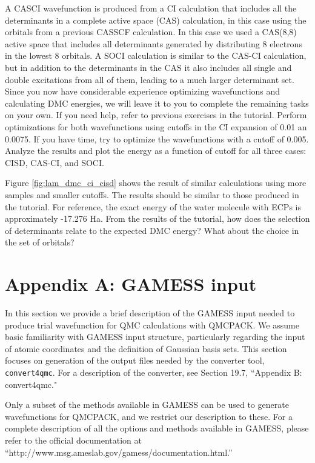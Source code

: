A CASCI wavefunction is produced from a CI calculation that includes all the determinants 
in a complete active space (CAS) calculation, in this case using the orbitals from a previous CASSCF
calculation. In this case we used a CAS(8,8) active space that includes all determinants
generated by distributing 8 electrons in the lowest 8 orbitals. A SOCI calculation is similar
to the CAS-CI calculation, but in addition to the determinants in the CAS it also includes
all single and double excitations from all of them, leading to a much larger determinant
set. Since you now have considerable experience optimizing wavefunctions and calculating
DMC energies, we will leave it to you to complete the remaining tasks on your own.
If you need help, refer to previous exercises in the tutorial. Perform optimizations for both
wavefunctions using cutoffs in the CI expansion of 0.01 an 0.0075. If you have time, try to optimize the wavefunctions with a cutoff of 0.005. Analyze the results and plot
the energy as a function of cutoff for all three cases: CISD, CAS-CI, and SOCI.

Figure  \ref{fig:lam_dmc_ci_cisd} shows the result of similar calculations using more samples and smaller cutoffs.
The results should be similar to those produced in the tutorial. For reference, the exact
energy of the water molecule with ECPs is approximately -17.276 Ha. From the results of the
tutorial, how does the selection of determinants relate to the expected DMC energy?
What about the choice in the set of orbitals?


\newpage
\section{Appendix A: GAMESS input}
In this section we provide a brief description of the GAMESS input needed to produce
trial wavefunction for QMC calculations with QMCPACK. We assume basic familiarity
with GAMESS input structure, particularly regarding the input of atomic coordinates and
the definition of Gaussian basis sets. This section focuses on generation of the output
files needed by the converter tool, \texttt{convert4qmc}. For a description of the converter, see Section 19.7, ``Appendix B: convert4qmc."

Only a subset of the methods available in GAMESS can be used to generate wavefunctions 
for QMCPACK, and we restrict our description to these.
For a complete description of all the options and methods available
in GAMESS, please refer to the official documentation at ``http://www.msg.ameslab.gov/gamess/documentation.html.”

